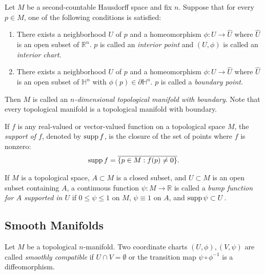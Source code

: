 \begin{defn}
  Let $M$ be a second-countable Hausdorff space and fix $n$.
  Suppose that for every $p \in M$, one of the following conditions is satisfied:
  \begin{enumerate}
    \item
      There exists a neighborhood $U$ of $p$ and a homeomorphism $\phi:U \rightarrow \hat{U}$ where $\hat{U}$ is an open subset of $\mathbb{R}^n$.
      $p$ is called an \textit{interior point} and $(U, \phi)$ is called an \textit{interior chart}.
    \item
      There exists a neighborhood $U$ of $p$ and a homeomorphism $\phi:U \rightarrow \hat{U}$ where $\hat{U}$ is an open subset of $\mathbb{H}^n$ with $\phi(p) \in \partial \mathbb{H}^n$.
      $p$ is called a \textit{boundary point}.
  \end{enumerate}
  Then $M$ is called an \textit{$n$-dimensional topological manifold with boundary}.
  Note that every topological manifold is a topological manifold with boundary.
\end{defn}

\begin{defn}[Support]
  If $f$ is any real-valued or vector-valued function on a topological space $M$, the \textit{support of $f$}, denoted by $\operatorname{supp} f$, is the closure of the set of points where $f$ is nonzero:
  \begin{align*}
    \operatorname{supp} f = \overline{\{p \in M : f(p) \ne 0 \}}.
  \end{align*}
\end{defn}

\begin{defn}
  If $M$ is a topological space, $A \subset M$ is a closed subset, and $U \subset M$ is an open subset containing $A$, a continuous function $\psi: M \rightarrow \mathbb{R}$ is called a \textit{bump function for $A$ supported in $U$} if $0 \leq \psi \leq 1$ on $M$, $\psi \equiv 1$ on $A$, and $\operatorname{supp} \psi \subset U$.
\end{defn}

\subsection{Smooth Manifolds}

\begin{defn}
  Let $M$ be a topological $n$-manifold.
  Two coordinate charts $(U, \phi), (V, \psi)$ are called \textit{smoothly compatible} if $U \cap V = \emptyset$ or the transition map $\psi \circ \phi^{-1}$ is a diffeomorphism.
\end{defn}

